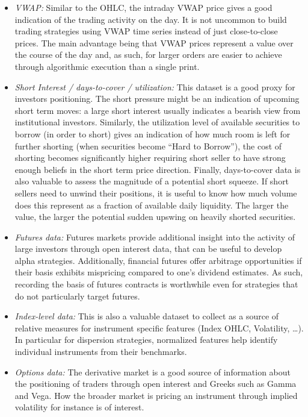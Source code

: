 \begin{itemize}
\item \emph{VWAP:} Similar to the OHLC, the intraday VWAP price gives a good indication of the trading activity on the day. It is not uncommon to build trading strategies using VWAP time series instead of just close-to-close prices. The main advantage being that VWAP prices represent a value over the course of the day and, as such, for larger orders are easier to achieve through algorithmic execution than a single print.


\item \emph{Short Interest / days-to-cover / utilization:} This dataset is a good proxy for investors positioning. The short pressure might be an indication of upcoming short term moves: a large short interest usually indicates a bearish view from institutional investors. Similarly, the utilization level of available securities to borrow (in order to short) gives an indication of how much room is left for further shorting (when securities become ``Hard to Borrow''), the cost of shorting becomes significantly higher requiring short seller to have strong enough beliefs in the short term price direction. Finally, days-to-cover data is also valuable to assess the magnitude of a potential short squeeze. If short sellers need to unwind their positions, it is useful to know how much volume does this represent as a fraction of available daily liquidity. The larger the value, the larger the potential sudden upswing on heavily shorted securities.


\item \emph{Futures data:} Futures markets provide additional insight into the activity of large investors through open interest data, that can be useful to develop alpha strategies. Additionally, financial futures offer arbitrage opportunities if their basis exhibits mispricing compared to one's dividend estimates. As such, recording the basis of futures contracts is worthwhile even for strategies that do not particularly target futures.


\item \emph{Index-level data:} This is also a valuable dataset to collect as a source of relative measures for instrument specific features (Index OHLC, Volatility, \dots). In particular for dispersion strategies, normalized features help identify individual instruments from their benchmarks. 


\item \emph{Options data:} The derivative market is a good source of information about the positioning of traders through open interest and Greeks such as Gamma and Vega. How the broader market is pricing an instrument through implied volatility for instance is of interest.



\end{itemize}
